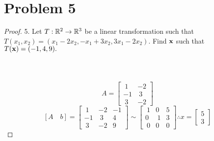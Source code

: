 \documentclass[12pt]{article}
\newcommand{\tab}{\\\\}
\newcommand{\sect}[1]{\section*{#1}}
\begin{document}
\sect{Problem 5}
\begin{proof}
  5. Let $T: {\Bbb R}^2 \rightarrow {\Bbb R}^3$ be a linear transformation such that \\
  $T(x_1,x_2) = (x_1-2x_2,-x_1+3x_2,3x_1-2x_2).$ Find ${\bf x}$ such that $T({\bf x}) = (-1,4,9).$
  \tab\tab
  \[
    A=\begin{bmatrix}
      ~1&-2\\-1&~3\\~3&-2
  \end{bmatrix}
  \]
  \[
  [A \quad b]=
  \begin{bmatrix}
    ~1&-2&-1\\-1&~3&4\\~3&-2&9
  \end{bmatrix}\sim
  \begin{bmatrix}
    ~1&0&5\\0&~1&3\\~0&0&0
  \end{bmatrix}
  \therefore x=\begin{bmatrix}
    5\\3
  \end{bmatrix}
  \]
  \noindent
\end{proof}\tab\tab
\end{document}

